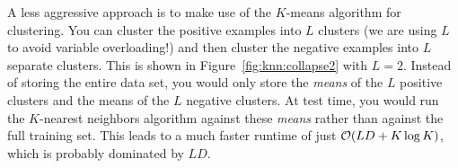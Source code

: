 A less aggressive approach is to make use of the $K$-means algorithm
for clustering.  You can cluster the positive examples into $L$
clusters (we are using $L$ to avoid variable overloading!) and then
cluster the negative examples into $L$ separate clusters.  This is
shown in Figure~\ref{fig:knn:collapse2} with $L=2$.  Instead of storing the
entire data set, you would only store the \emph{means} of the $L$
positive clusters and the means of the $L$ negative clusters.  At test
time, you would run the $K$-nearest neighbors algorithm against these
\emph{means} rather than against the full training set.  This leads to
a much faster runtime of just $\mathcal{O}(L D + K \log K)$, which is probably
dominated by $LD$.



\begin{comment}
Similarities versus distances
Relationship to databases
Underfitting/overfitting by k
Weighted voting
From two classes to M classes
Decision boundaries for knn versus dts
Computational complexity
Reducing each class to one point: means
K-means clustering
\end{comment}

\begin{exercises}
\begin{Ex}
\TODO

\begin{solution}
\TODO
\end{solution}
\end{Ex}

\end{exercises}

